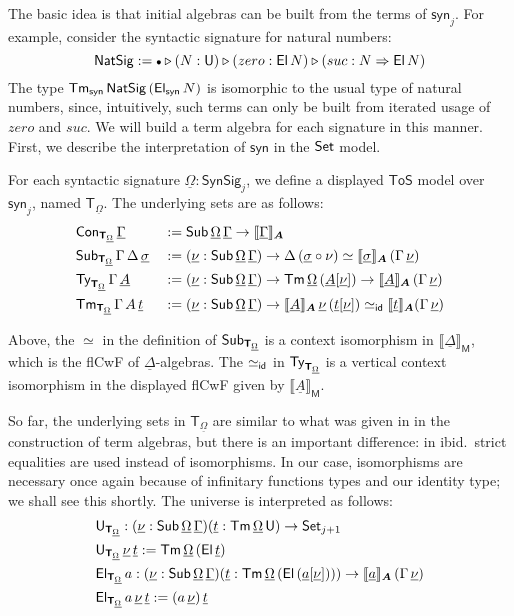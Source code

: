 \documentclass[sigplan,review,anonymous]{acmart}\settopmatter{printfolios=true,printccs=false,printacmref=false}
\newcommand{\ToS}{\mathsf{ToS}}
\newcommand{\ext}{\triangleright}
\newcommand{\emptycon}{\scaleobj{.75}\bullet}
\newcommand{\NatSig}{\mathsf{NatSig}}
\newcommand{\arri}{\Rightarrow}
\newcommand{\syn}{\mathsf{syn}}
\newcommand{\SynSig}{\mathsf{SynSig}}
\newcommand{\bA}{\boldsymbol{A}}
\newcommand{\bM}{\boldsymbol{\mathsf{M}}}
\newcommand{\bT}{\boldsymbol{\mathsf{T}}}
\newcommand{\ul}[1]{\underline{#1}}
\newcommand{\ulGamma}{\ul{\Gamma}}
\newcommand{\ulDelta}{\ul{\Delta}}
\newcommand{\ulOmega}{\ul{\Omega}}
\newcommand{\ulsigma}{\ul{\sigma}}
\newcommand{\ulnu}{\ul{\nu}}
\newcommand{\ult}{\ul{t}}
\newcommand{\ulA}{\ul{A}}
\newcommand{\ula}{\ul{a}}
\newcommand{\llb}{\llbracket}
\newcommand{\rrb}{\rrbracket}
\begin{document}
The basic idea is that initial algebras can be built from the terms of $\syn_j$.
For example, consider the syntactic signature for natural numbers:
\[
\NatSig := \emptycon\ext(N : \U)\ext(zero : \El\,N)\ext (suc : N
\arri \El\,N)
\]
The type $\Tm_{\syn}\,\NatSig\,(\El_{\syn}\,N)$ is isomorphic to the usual type
of natural numbers, since, intuitively, such terms can only be built from
iterated usage of $zero$ and $suc$. We will build a term algebra for each
signature in this manner. First, we describe the interpretation of $\syn$ in the
$\mathsf{Set}$ model.

\begin{definition}
For each syntactic signature $\ulOmega : \SynSig_j$, we define a displayed $\ToS$
model over $\syn_j$, named $\bT_{\ulOmega}$. The underlying sets are as follows:
\begin{alignat*}{3}
  & \Con_{\bT_{\ulOmega}}\,\ulGamma &&:= \Sub\,\ulOmega\,\ulGamma \ra \llb\ulGamma\rrb_{\bA}\\
  & \Sub_{\bT_{\ulOmega}}\,\Gamma\,\Delta\,\ulsigma &&:= (\ulnu : \Sub\,\ulOmega\,\ulGamma)
  \ra \Delta\,(\ulsigma\circ\nu) \simeq \llb\ulsigma\rrb_{\bA}\,(\Gamma\,\ulnu)\\
  & \Ty_{\bT_{\ulOmega}}\,\Gamma\,\ulA &&:= (\ulnu : \Sub\,\ulOmega\,\ulGamma) \ra
    \Tm\,\ulOmega\,(\ulA[\ulnu]) \ra \llb\ulA\rrb_{\bA}\,(\Gamma\,\ulnu)\\
  & \Tm_{\bT_{\ulOmega}}\,\Gamma\,A\,\ult &&:= (\ulnu : \Sub\,\ulOmega\,\ulGamma)\ra
    \llb\ulA\rrb_{\bA}\,\ulnu\,(\ult[\ulnu]) \simeq_{\id} \llb\ult\rrb_{\bA} (\Gamma\,\ulnu)
\end{alignat*}

Above, the $\simeq$ in the definition of $\Sub_{\bT_{\ulOmega}}$ is a context isomorphism
in $\llb\ulDelta\rrb_{\bM}$, which is the flCwF of $\ulDelta$-algebras. The
$\simeq_{\mathsf{id}}$ in $\Ty_{\bT_{\ulOmega}}$ is a vertical context isomorphism in the displayed
flCwF given by $\llb\ulA\rrb_{\bM}$.

So far, the underlying sets in $\bT_{\ulOmega}$ are similar to what was given in
\cite{kaposi2019constructing} in the construction of term algebras, but there is
an important difference: in ibid.\ strict equalities are used instead of
isomorphisms. In our case, isomorphisms are necessary once again because of
infinitary functions types and our identity type; we shall see this shortly. The
universe is interpreted as follows:
\begin{alignat*}{3}
  & \U_{\bT_{\ulOmega}} : (\ulnu : \Sub\,\ulOmega\,\ulGamma)(\ult : \Tm\,\ulOmega\,\U)\ra
              \Set_{j+1}\\
  & \U_{\bT_{\ulOmega}}\,\ulnu\,\ult := \Tm\,\ulOmega\,(\El\,\ult)\\
  & \El_{\bT_{\ulOmega}}\,a : (\ulnu : \Sub\,\ulOmega\,\ulGamma)
             (\ult : \Tm\,\ulOmega\,(\El\,(\ula[\ulnu])))\ra
              \llb\ula\rrb_{\bA}\,(\Gamma\,\ulnu)\\
  & \El_{\bT_{\ulOmega}}\,a\,\ulnu\,\ult := (a\,\ulnu)\,\ult
\end{alignat*}


\end{definition}
\end{document}
